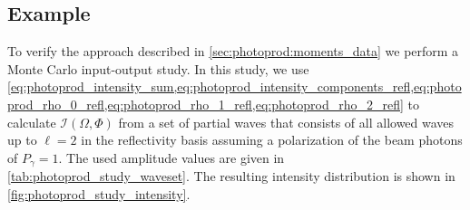 \subsection{Example}%
\label{sec:photoprod:example}

To verify the approach described in \cref{sec:photoprod:moments_data}
we perform a Monte Carlo input-output study.  In this study, we use
\cref{eq:photoprod_intensity_sum,eq:photoprod_intensity_components_refl,eq:photoprod_rho_0_refl,eq:photoprod_rho_1_refl,eq:photoprod_rho_2_refl}
to calculate $\mathcal{I}(\Omega, \Phi)$ from a set of partial waves
that consists of all allowed waves up to $\ell = 2$ in the
reflectivity basis assuming a polarization of the beam photons of
$P_\gamma = 1$.  The used amplitude values are given in
\cref{tab:photoprod_study_waveset}.  The resulting intensity
distribution is shown in \cref{fig:photoprod_study_intensity}.

